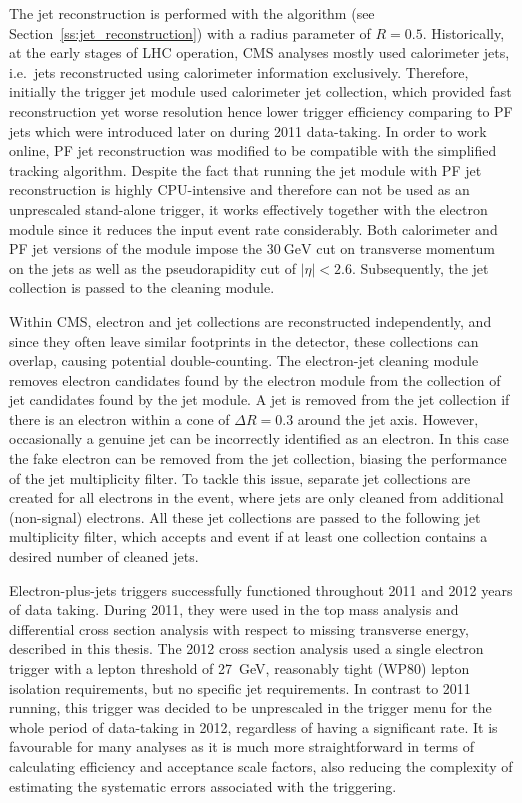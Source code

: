 The jet reconstruction is performed with the \antikt algorithm (see Section~\ref{ss:jet_reconstruction}) with a radius
parameter of $R = 0.5$. Historically, at the early stages of LHC operation, CMS analyses mostly used calorimeter jets,
i.e.\ jets reconstructed using calorimeter information exclusively. Therefore, initially the trigger jet module used
calorimeter jet collection, which provided fast reconstruction yet worse resolution hence lower trigger efficiency
comparing to PF jets which were introduced later on during 2011 data-taking. In order to work online, PF jet
reconstruction was modified to be compatible with the simplified tracking algorithm. Despite the fact that running the
jet module with PF jet reconstruction is highly CPU-intensive and therefore can not be used as an unprescaled
stand-alone trigger, it works effectively together with the electron module since it reduces the input event rate
considerably. Both calorimeter and PF jet versions of the module impose the $\SI{30}{\GeV}$ cut on transverse momentum
on the jets as well as the pseudorapidity cut of $|\eta| < 2.6$. Subsequently, the jet collection is passed to the
cleaning module.

Within CMS, electron and jet collections are reconstructed independently, and since they often leave similar footprints
in the detector, these collections can overlap, causing potential double-counting. The electron-jet cleaning module
removes electron candidates found by the electron module from the collection of jet candidates found by the jet module.
A jet is removed from the jet collection if there is an electron within a cone of $\Delta R = 0.3$ around the jet axis.
However, occasionally a genuine jet can be incorrectly identified as an electron. In this case the fake electron can be
removed from the jet collection, biasing the performance of the jet multiplicity filter. To tackle this issue, separate
jet collections are created for all electrons in the event, where jets are only cleaned from additional (non-signal)
electrons. All these jet collections are passed to the following jet multiplicity filter, which accepts and event if at
least one collection contains a desired number of cleaned jets.

Electron-plus-jets triggers successfully functioned throughout 2011 and 2012 years of data taking. During 2011, they
were used in the top mass analysis and differential cross section analysis with respect to missing transverse energy,
described in this thesis. The 2012 cross section analysis used a single electron trigger with a lepton \pt threshold of
\SI{27}{\GeV}, reasonably tight (WP80) lepton isolation requirements, but no specific jet requirements. In contrast to
2011 running, this trigger was decided to be unprescaled in the trigger menu for the whole period of data-taking in
2012, regardless of having a significant rate. It is favourable for many analyses as it is much more straightforward in
terms of calculating efficiency and acceptance scale factors, also reducing the complexity of estimating the systematic
errors associated with the triggering.

